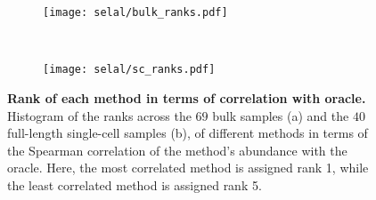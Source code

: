 \begin{figure}[t!]
    \centering
    \begin{subfigure}[t]{0.45\textwidth}
        \centering
	    \texttt{[image: selal/bulk\_ranks.pdf]}
	    \caption{}
	    \label{fig:bulk_ranks}
    \end{subfigure}
    ~
    \begin{subfigure}[t]{0.45\textwidth}
        \centering
	    \texttt{[image: selal/sc\_ranks.pdf]}
	    \caption{}
	    \label{fig:sc_ranks}
    \end{subfigure}
     \caption{\textbf{Rank of each method in terms of correlation with oracle.} Histogram of the ranks across the $69$ bulk samples (a) and 
       the $40$ full-length single-cell samples (b), of different
       methods in terms of the Spearman correlation of the method's abundance with
       the oracle. Here, the most correlated method is assigned rank 1, while
       the least correlated method is assigned rank 5.}
    \label{fig:rank}
\end{figure}

